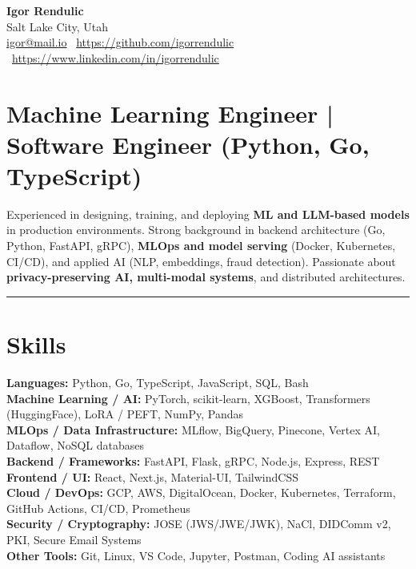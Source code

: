 \documentclass[11pt]{article}
\begin{document}
\begin{center}
  {\LARGE\bfseries Igor Rendulic}\\
  Salt Lake City, Utah\\
  \href{mailto:igor@mail.io}{igor@mail.io} \textbar\ 
  \href{https://github.com/igorrendulic}{https://github.com/igorrendulic} \textbar\ 
  \href{https://www.linkedin.com/in/igorrendulic}{https://www.linkedin.com/in/igorrendulic}
\end{center}

\section*{Machine Learning Engineer | Software Engineer (Python, Go, TypeScript)}
Experienced in designing, training, and deploying \textbf{ML and LLM-based models} in production environments. 
Strong background in backend architecture (Go, Python, FastAPI, gRPC), \textbf{MLOps and model serving} (Docker, Kubernetes, CI/CD), and applied AI (NLP, embeddings, fraud detection). 
Passionate about \textbf{privacy-preserving AI, multi-modal systems}, and distributed architectures.
\vspace{0.5em}
\hrule  
\vspace{1em}

\section*{Skills}
\noindent
\textbf{Languages:} Python, Go, TypeScript, JavaScript, SQL, Bash \\
\textbf{Machine Learning / AI:} PyTorch, scikit-learn, XGBoost, Transformers (HuggingFace), LoRA / PEFT, NumPy, Pandas \\
\textbf{MLOps / Data Infrastructure:} MLflow, BigQuery, Pinecone, Vertex AI, Dataflow, NoSQL databases \\
\textbf{Backend / Frameworks:} FastAPI, Flask, gRPC, Node.js, Express, REST \\
\textbf{Frontend / UI:} React, Next.js, Material-UI, TailwindCSS \\
\textbf{Cloud / DevOps:} GCP, AWS, DigitalOcean, Docker, Kubernetes, Terraform, GitHub Actions, CI/CD, Prometheus \\
\textbf{Security / Cryptography:} JOSE (JWS/JWE/JWK), NaCl, DIDComm v2, PKI, Secure Email Systems \\
\textbf{Other Tools:} Git, Linux, VS Code, Jupyter, Postman, Coding AI assistants
\end{document}
